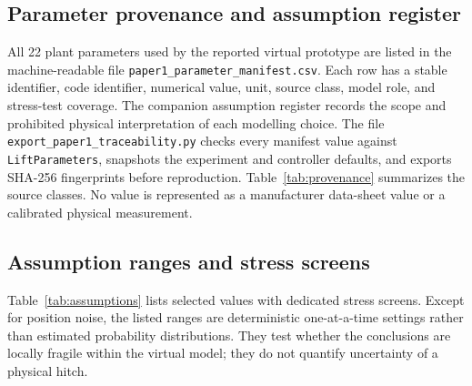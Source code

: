 \documentclass[agriengineering,article,submit,moreauthors]{Definitions/mdpi}
\begin{document}
\subsection{Parameter provenance and assumption register}
All 22 plant parameters used by the reported virtual prototype are listed in the machine-readable file \texttt{paper1\_parameter\_manifest.csv}. Each row has a stable identifier, code identifier, numerical value, unit, source class, model role, and stress-test coverage. The companion assumption register records the scope and prohibited physical interpretation of each modelling choice. The file \texttt{export\_paper1\_traceability.py} checks every manifest value against \texttt{LiftParameters}, snapshots the experiment and controller defaults, and exports SHA-256 fingerprints before reproduction. Table~\ref{tab:provenance} summarizes the source classes. No value is represented as a manufacturer data-sheet value or a calibrated physical measurement.

\begin{table}[H]
\centering
\caption{Traceable parameter source classes for the paper-1 virtual prototype.}
\label{tab:provenance}
\end{table}

\subsection{Assumption ranges and stress screens}
Table~\ref{tab:assumptions} lists selected values with dedicated stress screens. Except for position noise, the listed ranges are deterministic one-at-a-time settings rather than estimated probability distributions. They test whether the conclusions are locally fragile within the virtual model; they do not quantify uncertainty of a physical hitch.
\end{document}

